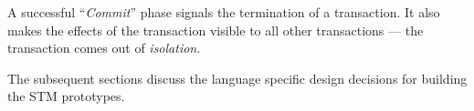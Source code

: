 \documentclass[../main]{subfiles}
\begin{document}
  \par 
  A successful ``{\em Commit}'' phase signals the termination of a transaction. It also makes the effects of the transaction visible to all other transactions --- the transaction comes out of {\em isolation}. \par

  The subsequent sections discuss the language specific design decisions for building the STM prototypes.
\end{document}
